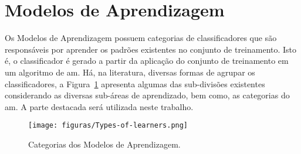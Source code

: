 \section{Modelos de Aprendizagem}
    \label{sec:classifiers}
    
    Os Modelos de Aprendizagem possuem categorias de classificadores que são responsáveis por aprender os padrões existentes no conjunto de treinamento. Isto é, o classificador é gerado a partir da aplicação do conjunto de treinamento em um algoritmo de \ac{am}. Há, na literatura, diversas formas de agrupar os classificadores, a Figura~\ref{fig:types-of-learners} apresenta algumas das sub-divisões existentes considerando as diversas sub-áreas de aprendizado, bem como, as categorias do \ac{am}. A parte destacada será utilizada neste trabalho.
    
    \begin{figure}[!h]
        \centering
        \caption{Categorias dos Modelos de Aprendizagem.}
        \texttt{[image: figuras/Types-of-learners.png]}
        \label{fig:types-of-learners}
    \end{figure}





